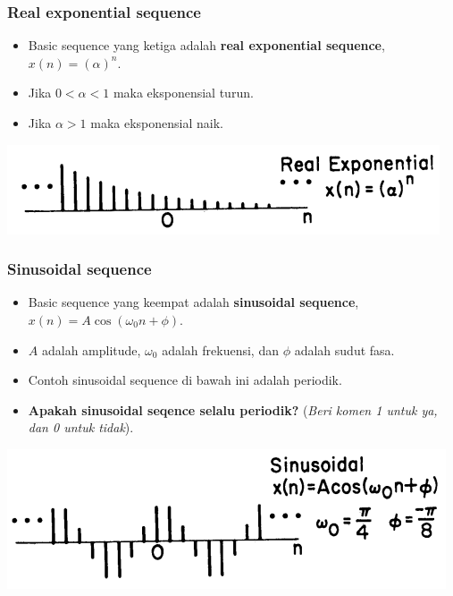 \documentclass[pdflatex,compress]{beamer}
\begin{document}
\begin{frame}
	\frametitle{Real exponential sequence}
	\begin{itemize}
		\item Basic sequence yang ketiga adalah \textbf{real exponential sequence}, $ x(n) = (\alpha)^n $.
		\item Jika $ 0 < \alpha < 1 $ maka eksponensial turun.
		\item Jika $ \alpha > 1 $ maka eksponensial naik.
	\end{itemize}
	\begin{center}
		\includegraphics[width=0.8\linewidth]{img/img009}
	\end{center}
\end{frame}

\begin{frame}
	\frametitle{Sinusoidal sequence}
	\begin{itemize}
		\item Basic sequence yang keempat adalah \textbf{sinusoidal sequence}, $ x(n) = A\cos(\omega_0 n + \phi) $.
		\item $ A $ adalah amplitude, $ \omega_0 $ adalah frekuensi, dan $ \phi $ adalah sudut fasa.
		\item Contoh sinusoidal sequence di bawah ini adalah periodik.
		\item \textbf{Apakah sinusoidal seqence selalu periodik?} (\textit{Beri komen 1 untuk ya, dan 0 untuk tidak}).
	\end{itemize}
	\begin{center}
		\includegraphics[width=0.8\linewidth]{img/img010}
	\end{center}
\end{frame}
\end{document}
